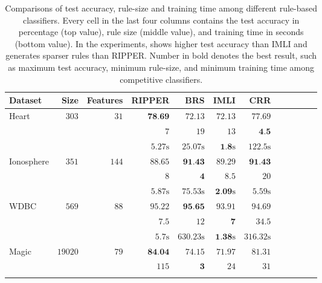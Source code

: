 \begin{table}
	\caption[Accuracy, rule-size, and training time of rule-based classifiers]{Comparisons of test accuracy, rule-size and training time among different rule-based classifiers. Every cell in the last four columns contains the test accuracy in percentage (top value), rule size  (middle value), and  training time in seconds (bottom value). In the experiments, {\crr} shows higher test accuracy than IMLI and generates sparser rules than RIPPER. Number in bold denotes the best result, such as maximum test accuracy, minimum rule-size, and minimum training time among competitive classifiers.}
	\label{interpretability_crr_tab:rule_based_classifiers}
	
	
	\begin{center}
		\begin{tabular}{l  r  r r r r r r r rrr}
			\toprule
			{{Dataset}} & Size & Features  & RIPPER & BRS & IMLI & CRR\\
			\midrule
			{ Heart}   & $  303 $  & $  31 $  & $   \textbf{78.69}  $    & $   72.13  $    & $   72.13  $    & $   77.69  $   \\ & & 
			& $   7 $    & $   19 $    & $   13 $    & $   \textbf{4.5}  $   \\ & & 
			& $   5.27 \text{s}  $    & $   25.07 \text{s}  $    & $   \textbf{1.8} \text{s}  $    & $   122.5 \text{s}  $   \\
			\midrule 
			{ Ionosphere}   & $  351 $  & $  144 $  & $   88.65  $    & $   \textbf{91.43}  $    & $   89.29  $    & $   \textbf{91.43}  $   \\ & & 
			& $   8 $    & $   \textbf{4} $    & $   8.5  $    & $   20 $   \\ & & 
			& $   5.87 \text{s}  $    & $   75.53 \text{s}  $    & $   \textbf{2.09} \text{s}  $    & $   5.59 \text{s}  $   \\
			\midrule 
			{ WDBC}   & $  569 $  & $  88 $  & $   95.22  $    & $   \textbf{95.65}  $    & $   93.91  $    & $   94.69  $   \\ & & 
			& $   7.5  $    & $   12 $    & $   \textbf{7} $    & $   34.5  $   \\ & & 
			& $   5.7 \text{s}  $    & $   630.23 \text{s}  $    & $   \textbf{1.38} \text{s}  $    & $   316.32 \text{s}  $   \\
			\midrule 
			{ Magic}   & $  19020 $  & $  79 $  & $   \textbf{84.04}  $    & $   74.15  $    & $   71.97  $    & $   81.31  $   \\ & & 
			& $   115 $    & $   \textbf{3} $    & $   24 $    & $   31 $   \\ & & 

\end{tabular}
\end{center}
\end{table}
